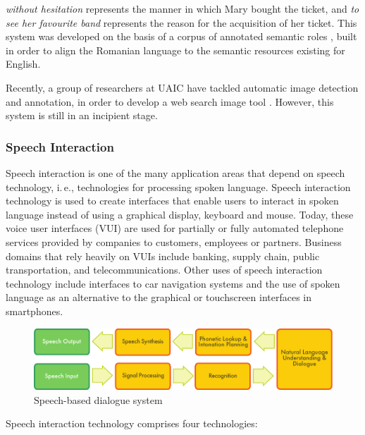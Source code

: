 \begin{multicols}{2}
\noindent\textit{without hesitation} represents the manner in which Mary bought the ticket, and \textit{to see her favourite band} represents  the reason for the acquisition of her ticket. This system was developed on the basis of a corpus of annotated semantic roles \cite{trandabat}, built in order to align the Romanian language to the semantic resources existing for English.

Recently, a group of researchers at UAIC have tackled automatic image detection and annotation, in order to develop a web search image tool \cite{iftene}. However, this system is still in an incipient stage.

\subsubsection{Speech Interaction}

Speech interaction is one of the many application areas that depend on speech technology, i.\,e., technologies for processing spoken language. Speech interaction technology is used to create interfaces that enable users to interact in spoken language instead of using a graphical display, keyboard and mouse.  Today, these voice user interfaces (VUI) are used for partially or fully automated telephone services provided by companies to customers, employees or partners. Business domains that rely heavily on VUIs include banking, supply chain, public transportation, and telecommunications. Other uses of speech interaction technology include interfaces to car navigation systems and the use of spoken language as an alternative to the graphical or touchscreen interfaces in smartphones.

\begin{figure}[htb]
  \center
  \includegraphics[width=\textwidth]{../_media/english/simple_speech-based_dialogue_architecture}
  \caption{Speech-based dialogue system}
  \label{fig:dialoguearch_en}
  \vspace{-15mm}
\end{figure}

Speech interaction technology comprises four technologies: 


\end{multicols}
